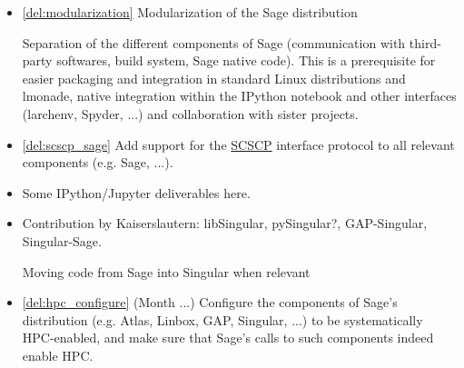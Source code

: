 \begin{Workpackage}{\thewpno}
\begin{WPDeliverables}
\begin{itemize}
\item \ref{del:modularization} Modularization of the Sage distribution

  Separation of the different components of Sage (communication with
  third-party softwares, build system, Sage native code). This is a
  prerequisite for easier packaging and integration in standard Linux
  distributions and lmonade, native integration within the IPython
  notebook and other interfaces (larchenv, Spyder, ...) and
  collaboration with sister projects.



\item \ref{del:scscp_sage} Add support for the
  \href{http://www.symbolic-computing.org/}{SCSCP} interface protocol
  to all relevant components (e.g. Sage, ...).

\item Some IPython/Jupyter deliverables here.

\item Contribution by Kaiserslautern: libSingular, pySingular?,
  GAP-Singular, Singular-Sage.

  Moving code from Sage into Singular when relevant


\item \ref{del:hpc_configure} (Month ...) Configure the components of
  Sage's distribution (e.g. Atlas, Linbox, GAP, Singular, ...) to be
  systematically HPC-enabled, and make sure that Sage's calls to such
  components indeed enable HPC.


\end{itemize}
\end{WPDeliverables}
\end{Workpackage}
